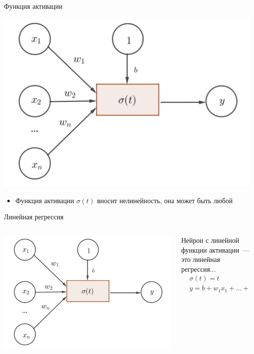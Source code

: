 \documentclass[notes,12pt, aspectratio=169]{beamer}
\begin{document}
\begin{frame}{Функция активации}
\begin{center}
	\includegraphics[width=0.51\linewidth]{neuron_3.png}
\end{center}
\begin{itemize}
	\item Функция активации $\sigma(t)$ вносит нелинейность, она может быть любой
\end{itemize}
\end{frame}


\begin{frame}{Линейная регрессия}
\begin{columns}[T] 
	\begin{column}{.45\textwidth}
		\begin{center}
			\includegraphics[width=0.99\linewidth]{neuron_3.png}
		\end{center}
	\end{column}%
	\hfill%
	\begin{column}{.55\textwidth}
		Нейрон с линейной функции активации~—   это линейная регрессия... 
		\begin{equation*}
		\begin{aligned}
		& \sigma(t) = t \\
		& y= b + w_1 x_1 + \ldots + w_n x_n \\
		\end{aligned}
		\end{equation*}
	\end{column}%
\end{columns}
\end{frame}
\end{document}
